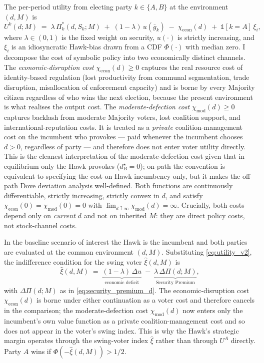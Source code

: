 \documentclass[11pt,twoside]{extarticle}
\begin{document}
The per-period utility from electing party $k\in\{A,B\}$ at the environment $(d,M)$ is
\begin{equation}\label{eq:utility_v2}
    U^k(d;M)\;=\;\lambda\,\Pi_k^*(d,S_k;M)\;+\;(1-\lambda)\,u(\bar g_k)\;-\;\chi_{\mathrm{econ}}(d)\;+\;\mathbb{1}[k=A]\,\xi_i,
\end{equation}
where $\lambda\in(0,1)$ is the fixed weight on security, $u(\cdot)$ is strictly increasing, and $\xi_i$ is an idiosyncratic Hawk-bias drawn from a CDF $\Phi(\cdot)$ with median zero. I decompose the cost of symbolic policy into two economically distinct channels. The \emph{economic-disruption cost} $\chi_{\mathrm{econ}}(d)\ge 0$ captures the real resource cost of identity-based regulation (lost productivity from communal segmentation, trade disruption, misallocation of enforcement capacity) and is borne by every Majority citizen regardless of who wins the next election, because the present environment is what realises the output cost. The \emph{moderate-defection cost} $\chi_{\mathrm{mod}}(d)\ge 0$ captures backlash from moderate Majority voters, lost coalition support, and international-reputation costs. It is treated as a \emph{private} coalition-management cost on the incumbent who provokes --- paid whenever the incumbent chooses $d>0$, regardless of party --- and therefore does not enter voter utility directly. This is the cleanest interpretation of the moderate-defection cost given that in equilibrium only the Hawk provokes ($d_B^\star=0$); on-path the convention is equivalent to specifying the cost on Hawk-incumbency only, but it makes the off-path Dove deviation analysis well-defined. Both functions are continuously differentiable, strictly increasing, strictly convex in $d$, and satisfy $\chi_{\mathrm{econ}}(0)=\chi_{\mathrm{mod}}(0)=0$ with $\lim_{d\uparrow\infty}\chi_{\mathrm{mod}}(d)=\infty$. Crucially, both costs depend only on \emph{current} $d$ and not on inherited $M$: they are direct policy costs, not stock-channel costs.

In the baseline scenario of interest the Hawk is the incumbent and both parties are evaluated at the common environment $(d,M)$. Substituting \autoref{eq:utility_v2}, the indifference condition for the swing voter $\hat\xi(d,M)$ is
\begin{equation}\label{eq:swing_v2}
    \hat\xi(d,M)\;=\;\underbrace{(1-\lambda)\,\Delta u}_{\text{economic deficit}}\;-\;\underbrace{\lambda\,\Delta\Pi(d;M)}_{\text{Security Premium}},
\end{equation}
with $\Delta\Pi(d;M)$ as in \autoref{eq:security_premium_d}. The economic-disruption cost $\chi_{\mathrm{econ}}(d)$ is borne under either continuation as a voter cost and therefore cancels in the comparison; the moderate-defection cost $\chi_{\mathrm{mod}}(d)$ now enters only the incumbent's own value function as a private coalition-management cost and so does not appear in the voter's swing index. This is why the Hawk's strategic margin operates through the swing-voter index $\hat\xi$ rather than through $U^A$ directly. Party $A$ wins if $\Phi(-\hat\xi(d,M))>1/2$.
\end{document}
